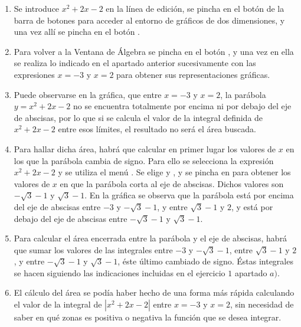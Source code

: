 \begin{enumerate}[leftmargin=*]
\begin{indication}
{\begin{enumerate}
\item Se introduce $x^{2}+2x-2$ en la línea de edición, se pincha en el botón
  de la barra de botones para acceder al entorno de gráficos de dos dimensiones, y
una vez allí se pincha en el botón .

\item Para volver a la Ventana de Álgebra se pincha en el botón
, y una vez en ella se realiza
lo indicado en el apartado anterior sucesivamente con las
expresiones $x=-3$ y $x=2$ para obtener sus representaciones
gráficas.

\item Puede observarse en la gráfica, que entre $x=-3$ y $x=2$,
la parábola $y=x^{2}+2x-2$ no se encuentra totalmente por encima ni
por debajo del eje de abscisas, por lo que si se calcula el valor de
la integral definida de $x^{2}+2x-2$ entre esos límites, el
resultado no será el área buscada.

\item Para hallar dicha área, habrá que calcular en primer lugar los valores
de $x$ en los que la parábola cambia de signo. Para ello se
selecciona la expresión $x^{2}+2x-2$ y se utiliza el menú
. Se elige  y
, y se pincha en  para obtener
los valores de $x$ en que la parábola corta al eje de abscisas.
Dichos valores son $-\sqrt{3}-1$ y $\sqrt{3}-1$. En la gráfica se
observa que la parábola está por encima del eje de abscisas entre
$-3$ y $-\sqrt{3}-1$, y entre $\sqrt{3}-1$ y $2$, y está por debajo
del eje de abscisas entre $-\sqrt{3}-1$ y $\sqrt{3}-1$.

\item Para calcular el área encerrada entre la parábola y el eje de
abscisas, habrá que sumar los valores de las integrales entre $-3$ y
$-\sqrt{3}-1$, entre $\sqrt{3}-1$ y $2$, y entre $-\sqrt{3}-1$ y
$\sqrt{3}-1$, éste último cambiado de signo. Éstas integrales se
hacen siguiendo las indicaciones incluidas en el ejercicio $1$
apartado $a)$.

\item El cálculo del área se podía haber hecho de una forma más rápida
calculando el valor de la integral de $|x^{2}+2x-2|$ entre $x=-3$ y
$x=2$, sin necesidad de saber en qué zonas es positiva o negativa la
función que se desea integrar.

\end{enumerate}
}
\end{indication}


\end{enumerate}
